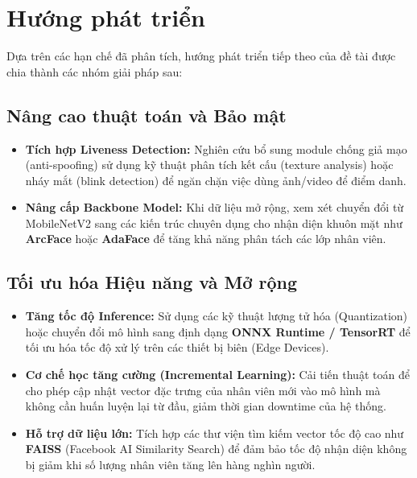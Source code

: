 \documentclass[a4paper]{book}
\begin{document}
\section{Hướng phát triển}

Dựa trên các hạn chế đã phân tích, hướng phát triển tiếp theo của đề tài được chia thành các nhóm giải pháp sau:

\subsection*{Nâng cao thuật toán và Bảo mật}
\begin{itemize}
    \item \textbf{Tích hợp Liveness Detection:} Nghiên cứu bổ sung module chống giả mạo (anti-spoofing) sử dụng kỹ thuật phân tích kết cấu (texture analysis) hoặc nháy mắt (blink detection) để ngăn chặn việc dùng ảnh/video để điểm danh.
    \item \textbf{Nâng cấp Backbone Model:} Khi dữ liệu mở rộng, xem xét chuyển đổi từ MobileNetV2 sang các kiến trúc chuyên dụng cho nhận diện khuôn mặt như \textbf{ArcFace} hoặc \textbf{AdaFace} để tăng khả năng phân tách các lớp nhân viên.
\end{itemize}

\subsection*{Tối ưu hóa Hiệu năng và Mở rộng}
\begin{itemize}
    \item \textbf{Tăng tốc độ Inference:} Sử dụng các kỹ thuật lượng tử hóa (Quantization) hoặc chuyển đổi mô hình sang định dạng \textbf{ONNX Runtime / TensorRT} để tối ưu hóa tốc độ xử lý trên các thiết bị biên (Edge Devices).
    \item \textbf{Cơ chế học tăng cường (Incremental Learning):} Cải tiến thuật toán để cho phép cập nhật vector đặc trưng của nhân viên mới vào mô hình mà không cần huấn luyện lại từ đầu, giảm thời gian downtime của hệ thống.
    \item \textbf{Hỗ trợ dữ liệu lớn:} Tích hợp các thư viện tìm kiếm vector tốc độ cao như \textbf{FAISS} (Facebook AI Similarity Search) để đảm bảo tốc độ nhận diện không bị giảm khi số lượng nhân viên tăng lên hàng nghìn người.
\end{itemize}
\end{document}
